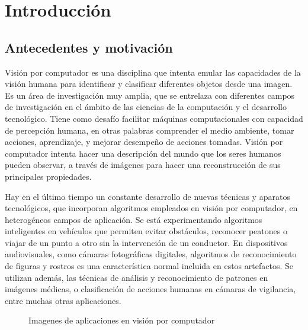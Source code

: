 \chapter{Introducción}
\section{Antecedentes y motivación}
\indent Visión por computador es una disciplina que intenta emular las capacidades de la visión humana para identificar y clasificar diferentes objetos desde una imagen. Es un área de investigación muy amplia, que se entrelaza con diferentes campos de investigación en el ámbito de las ciencias de la computación y el desarrollo tecnológico. Tiene como desafío facilitar máquinas computacionales con capacidad de percepción humana, en otras palabras comprender el medio ambiente, tomar acciones, aprendizaje, y mejorar desempeño de acciones tomadas. Visión por computador intenta hacer una descripción del mundo que los seres humanos pueden observar, a través de imágenes para hacer una reconstrucción de sus principales propiedades.

\indent Hay en el último tiempo un constante desarrollo de nuevas técnicas y aparatos tecnológicos, que incorporan algoritmos empleados en visión por computador, en heterogéneos campos de aplicación. Se está experimentando algoritmos inteligentes en vehículos que permiten evitar obstáculos, reconocer peatones o viajar de un punto a otro sin la intervención de un conductor. En dispositivos audiovisuales, como cámaras fotográficas digitales, algoritmos de reconocimiento de figuras y rostros es una característica normal incluida en estos artefactos. Se utilizan además, las técnicas de análisis y reconocimiento de patrones en imágenes médicas, o clasificación de acciones humanas en cámaras de vigilancia, entre muchas otras aplicaciones.


\begin{figure}
\centering     %
{}
\caption[Aplicaciones en visión por computador]{Imagenes de aplicaciones en visión por computador }
\label{fig:aplicaciones_vision_por_computador}
\end{figure}


